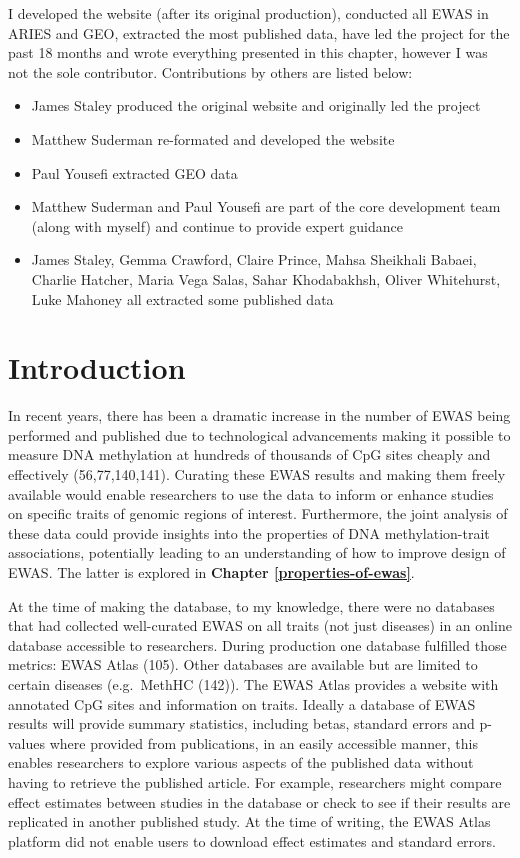 \documentclass[11pt,oneside]{bristolthesis}
\providecommand{\tightlist}{%
  \setlength{\itemsep}{0pt}\setlength{\parskip}{0pt}}
\begin{document}
I developed the website (after its original production), conducted all EWAS in ARIES and GEO, extracted the most published data, have led the project for the past 18 months and wrote everything presented in this chapter, however I was not the sole contributor. Contributions by others are listed below:
\begin{itemize}
\tightlist
\item
  James Staley produced the original website and originally led the project
\item
  Matthew Suderman re-formated and developed the website
\item
  Paul Yousefi extracted GEO data
\item
  Matthew Suderman and Paul Yousefi are part of the core development team (along with myself) and continue to provide expert guidance
\item
  James Staley, Gemma Crawford, Claire Prince, Mahsa Sheikhali Babaei, Charlie Hatcher, Maria Vega Salas, Sahar Khodabakhsh, Oliver Whitehurst, Luke Mahoney all extracted some published data
\end{itemize}
\hypertarget{introduction-03}{%
\section{Introduction}\label{introduction-03}}

In recent years, there has been a dramatic increase in the number of EWAS being performed and published due to technological advancements making it possible to measure DNA methylation at hundreds of thousands of CpG sites cheaply and effectively (56,77,140,141). Curating these EWAS results and making them freely available would enable researchers to use the data to inform or enhance studies on specific traits of genomic regions of interest. Furthermore, the joint analysis of these data could provide insights into the properties of DNA methylation-trait associations, potentially leading to an understanding of how to improve design of EWAS. The latter is explored in \textbf{Chapter \ref{properties-of-ewas}}.

At the time of making the database, to my knowledge, there were no databases that had collected well-curated EWAS on all traits (not just diseases) in an online database accessible to researchers. During production one database fulfilled those metrics: EWAS Atlas (105). Other databases are available but are limited to certain diseases (e.g.~MethHC (142)). The EWAS Atlas provides a website with annotated CpG sites and information on traits. Ideally a database of EWAS results will provide summary statistics, including betas, standard errors and p-values where provided from publications, in an easily accessible manner, this enables researchers to explore various aspects of the published data without having to retrieve the published article. For example, researchers might compare effect estimates between studies in the database or check to see if their results are replicated in another published study. At the time of writing, the EWAS Atlas platform did not enable users to download effect estimates and standard errors.
\end{document}
